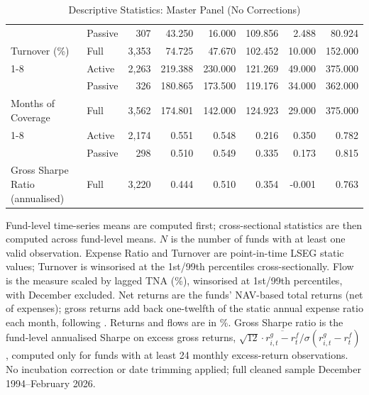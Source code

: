 \begin{table}[H]
{\begin{tabular}[t]{llrrrrrr}
 & Passive & 307 & 43.250 & 16.000 & 109.856 & 2.488 & 80.924\\

\multirow{-3}{*}{\raggedright\arraybackslash Turnover (\%)} & Full & 3,353 & 74.725 & 47.670 & 102.452 & 10.000 & 152.000\\
\cmidrule{1-8}
 & Active & 2,263 & 219.388 & 230.000 & 121.269 & 49.000 & 375.000\\

 & Passive & 326 & 180.865 & 173.500 & 119.176 & 34.000 & 362.000\\

\multirow{-3}{*}{\raggedright\arraybackslash Months of Coverage} & Full & 3,562 & 174.801 & 142.000 & 124.923 & 29.000 & 375.000\\
\cmidrule{1-8}
 & Active & 2,174 & 0.551 & 0.548 & 0.216 & 0.350 & 0.782\\

 & Passive & 298 & 0.510 & 0.549 & 0.335 & 0.173 & 0.815\\

\multirow{-3}{*}{\raggedright\arraybackslash Gross Sharpe Ratio (annualised)} & Full & 3,220 & 0.444 & 0.510 & 0.354 & -0.001 & 0.763\\
\bottomrule
\end{tabular}%
}
\setlength{\tabletempwidth}{\wd\tabletempbox}
\ifdim\tabletempwidth>\linewidth\setlength{\tabletempwidth}{\linewidth}\fi
\begin{minipage}{\tabletempwidth}
\captionsetup{width=\linewidth}
\caption{\label{tab:desc_stats_master}Descriptive Statistics: Master Panel (No Corrections)}
\ifdim\wd\tabletempbox>\linewidth
  \resizebox{\linewidth}{!}{\usebox{\tabletempbox}}
\else
  \usebox{\tabletempbox}
\fi
\par\medskip
\begin{singlespace}\footnotesize\noindent
Fund-level time-series means are computed first; cross-sectional statistics are then computed across fund-level means. $N$ is the number of funds with at least one valid observation. Expense Ratio and Turnover are point-in-time LSEG static values; Turnover is winsorised at the 1st/99th percentiles cross-sectionally. Flow is the \textcite{SirriTufano1998} measure scaled by lagged TNA (\%), winsorised at 1st/99th percentiles, with December excluded. Net returns are the funds' NAV-based total returns (net of expenses); gross returns add back one-twelfth of the static annual expense ratio each month, following \textcite{FamaFrench2010}. Returns and flows are in \%. Gross Sharpe ratio is the fund-level annualised Sharpe on excess gross returns, $\sqrt{12}\cdot\overline{r^{g}_{i,t}-r^{f}_{t}}/\sigma(r^{g}_{i,t}-r^{f}_{t})$, computed only for funds with at least 24 monthly excess-return observations. No incubation correction or date trimming applied; full cleaned sample December 1994--February 2026.
\end{singlespace}
\end{minipage}
\end{table}

